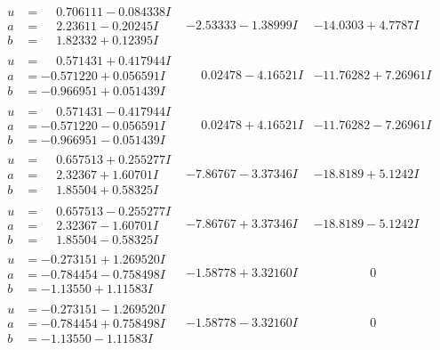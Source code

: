 \documentclass[1p]{elsarticle_modified}
\theoremstyle{definition}
\begin{document}
$$\begin{array}{c|c|c}
\begin{aligned}
u &= \phantom{-}0.706111 - 0.084338 I \\
a &= \phantom{-}2.23611 - 0.20245 I \\
b &= \phantom{-}1.82332 + 0.12395 I\end{aligned}
 & -2.53333 - 1.38999 I & -14.0303 + 4.7787 I \\ \hline\begin{aligned}
u &= \phantom{-}0.571431 + 0.417944 I \\
a &= -0.571220 + 0.056591 I \\
b &= -0.966951 + 0.051439 I\end{aligned}
 & \phantom{-}0.02478 - 4.16521 I & -11.76282 + 7.26961 I \\ \hline\begin{aligned}
u &= \phantom{-}0.571431 - 0.417944 I \\
a &= -0.571220 - 0.056591 I \\
b &= -0.966951 - 0.051439 I\end{aligned}
 & \phantom{-}0.02478 + 4.16521 I & -11.76282 - 7.26961 I \\ \hline\begin{aligned}
u &= \phantom{-}0.657513 + 0.255277 I \\
a &= \phantom{-}2.32367 + 1.60701 I \\
b &= \phantom{-}1.85504 + 0.58325 I\end{aligned}
 & -7.86767 - 3.37346 I & -18.8189 + 5.1242 I \\ \hline\begin{aligned}
u &= \phantom{-}0.657513 - 0.255277 I \\
a &= \phantom{-}2.32367 - 1.60701 I \\
b &= \phantom{-}1.85504 - 0.58325 I\end{aligned}
 & -7.86767 + 3.37346 I & -18.8189 - 5.1242 I \\ \hline\begin{aligned}
u &= -0.273151 + 1.269520 I \\
a &= -0.784454 - 0.758498 I \\
b &= -1.13550 + 1.11583 I\end{aligned}
 & -1.58778 + 3.32160 I & \phantom{-0.000000 } 0 \\ \hline\begin{aligned}
u &= -0.273151 - 1.269520 I \\
a &= -0.784454 + 0.758498 I \\
b &= -1.13550 - 1.11583 I\end{aligned}
 & -1.58778 - 3.32160 I & \phantom{-0.000000 } 0 \\ \hline\begin{aligned}

\end{aligned}
\end{array}$$
\end{document}
